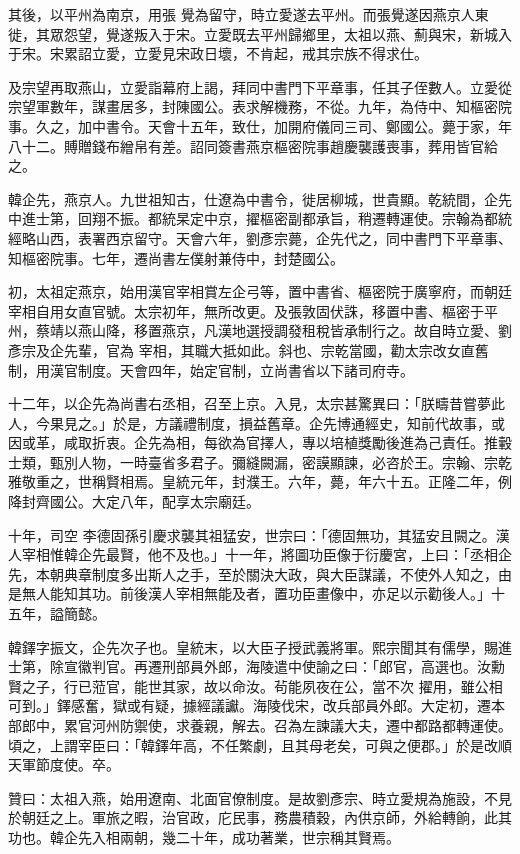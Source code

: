 \begin{pinyinscope}
 其後，以平州為南京，用張
 覺為留守，時立愛遂去平州。而張覺遂因燕京人東徙，其眾怨望，覺遂叛入于宋。立愛既去平州歸鄉里，太祖以燕、薊與宋，新城入于宋。宋累詔立愛，立愛見宋政日壞，不肯起，戒其宗族不得求仕。



 及宗望再取燕山，立愛詣幕府上謁，拜同中書門下平章事，任其子侄數人。立愛從宗望軍數年，謀畫居多，封陳國公。表求解機務，不從。九年，為侍中、知樞密院事。久之，加中書令。天會十五年，致仕，加開府儀同三司、鄭國公。薨于家，年八十二。賻贈錢布繒帛有差。詔同簽書燕京樞密院事趙慶襲護喪事，葬用皆官給之。



 韓企先，燕京人。九世祖知古，仕遼為中書令，徙居柳城，世貴顯。乾統間，企先中進士第，回翔不振。都統杲定中京，擢樞密副都承旨，稍遷轉運使。宗翰為都統經略山西，表署西京留守。天會六年，劉彥宗薨，企先代之，同中書門下平章事、知樞密院事。七年，遷尚書左僕射兼侍中，封楚國公。



 初，太祖定燕京，始用漢官宰相賞左企弓等，置中書省、樞密院于廣寧府，而朝廷宰相自用女直官號。太宗初年，無所改更。及張敦固伏誅，移置中書、樞密于平州，蔡靖以燕山降，移置燕京，凡漢地選授調發租稅皆承制行之。故自時立愛、劉彥宗及企先輩，官為
 宰相，其職大抵如此。斜也、宗乾當國，勸太宗改女直舊制，用漢官制度。天會四年，始定官制，立尚書省以下諸司府寺。



 十二年，以企先為尚書右丞相，召至上京。入見，太宗甚驚異曰：「朕疇昔嘗夢此人，今果見之。」於是，方議禮制度，損益舊章。企先博通經史，知前代故事，或因或革，咸取折衷。企先為相，每欲為官擇人，專以培植獎勵後進為己責任。推轂士類，甄別人物，一時臺省多君子。彌縫闕漏，密謨顯諫，必咨於王。宗翰、宗乾雅敬重之，世稱賢相焉。皇統元年，封濮王。六年，薨，年六十五。正隆二年，例降封齊國公。大定八年，配享太宗廟廷。



 十年，司空
 李德固孫引慶求襲其祖猛安，世宗曰：「德固無功，其猛安且闕之。漢人宰相惟韓企先最賢，他不及也。」十一年，將圖功臣像于衍慶宮，上曰：「丞相企先，本朝典章制度多出斯人之手，至於關決大政，與大臣謀議，不使外人知之，由是無人能知其功。前後漢人宰相無能及者，置功臣畫像中，亦足以示勸後人。」十五年，謚簡懿。



 韓鐸字振文，企先次子也。皇統末，以大臣子授武義將軍。熙宗聞其有儒學，賜進士第，除宣徽判官。再遷刑部員外郎，海陵遣中使諭之曰：「郎官，高選也。汝勳賢之子，行已蒞官，能世其家，故以命汝。茍能夙夜在公，當不次
 擢用，雖公相可到。」鐸感奮，獄或有疑，據經議讞。海陵伐宋，改兵部員外郎。大定初，遷本部郎中，累官河州防禦使，求養親，解去。召為左諫議大夫，遷中都路都轉運使。頃之，上謂宰臣曰：「韓鐸年高，不任繁劇，且其母老矣，可與之便郡。」於是改順天軍節度使。卒。



 贊曰：太祖入燕，始用遼南、北面官僚制度。是故劉彥宗、時立愛規為施設，不見於朝廷之上。軍旅之暇，治官政，庀民事，務農積穀，內供京師，外給轉餉，此其功也。韓企先入相兩朝，幾二十年，成功著業，世宗稱其賢焉。



\end{pinyinscope}
